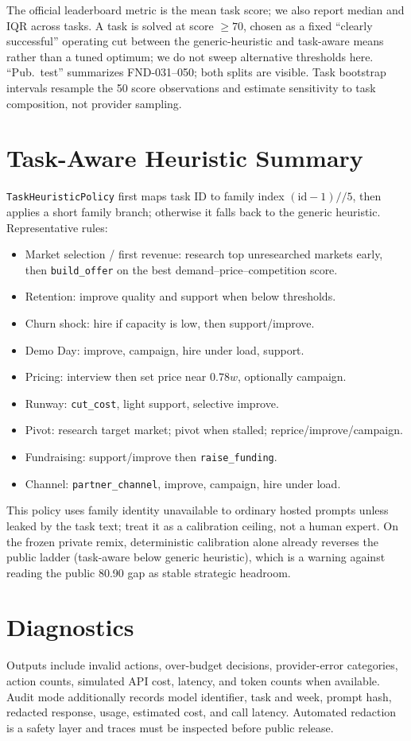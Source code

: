 \documentclass[sigconf]{acmart}
\begin{document}
The official leaderboard metric is the mean task score; we also report median and IQR across tasks.
A task is solved at score $\geq70$, chosen as a fixed ``clearly successful'' operating cut between the generic-heuristic and task-aware means rather than a tuned optimum; we do not sweep alternative thresholds here.
``Pub.\ test'' summarizes FND-031--050; both splits are visible.
Task bootstrap intervals resample the 50 score observations and estimate sensitivity to task composition, not provider sampling.

\section{Task-Aware Heuristic Summary}
\texttt{TaskHeuristicPolicy} first maps task ID to family index $({\mathrm{id}}-1)//5$, then applies a short family branch; otherwise it falls back to the generic heuristic.
Representative rules:
\begin{itemize}
  \item Market selection / first revenue: research top unresearched markets early, then \texttt{build\_offer} on the best demand--price--competition score.
  \item Retention: improve quality and support when below thresholds.
  \item Churn shock: hire if capacity is low, then support/improve.
  \item Demo Day: improve, campaign, hire under load, support.
  \item Pricing: interview then set price near $0.78w$, optionally campaign.
  \item Runway: \texttt{cut\_cost}, light support, selective improve.
  \item Pivot: research target market; pivot when stalled; reprice/improve/campaign.
  \item Fundraising: support/improve then \texttt{raise\_funding}.
  \item Channel: \texttt{partner\_channel}, improve, campaign, hire under load.
\end{itemize}
This policy uses family identity unavailable to ordinary hosted prompts unless leaked by the task text; treat it as a calibration ceiling, not a human expert.
On the frozen private remix, deterministic calibration alone already reverses the public ladder (task-aware below generic heuristic), which is a warning against reading the public 80.90 gap as stable strategic headroom.

\section{Diagnostics}
Outputs include invalid actions, over-budget decisions, provider-error categories, action counts, simulated API cost, latency, and token counts when available.
Audit mode additionally records model identifier, task and week, prompt hash, redacted response, usage, estimated cost, and call latency.
Automated redaction is a safety layer and traces must be inspected before public release.
\end{document}
